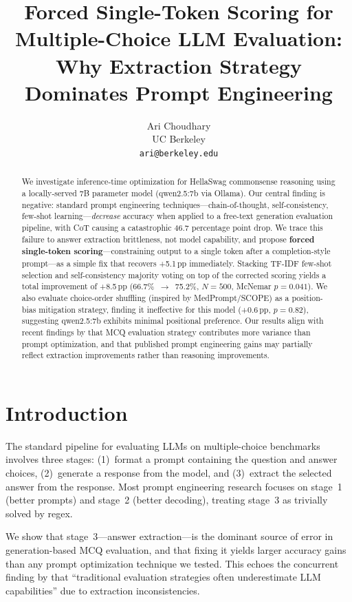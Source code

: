 \documentclass[11pt]{article}
\title{Forced Single-Token Scoring for Multiple-Choice LLM Evaluation:\\
Why Extraction Strategy Dominates Prompt Engineering}
\author{
  Ari Choudhary \\
  UC Berkeley \\
  \texttt{ari@berkeley.edu}
}
\date{}
\begin{document}
\maketitle

\begin{abstract}
We investigate inference-time optimization for HellaSwag commonsense reasoning using a locally-served 7B parameter model (qwen2.5:7b via Ollama). Our central finding is negative: standard prompt engineering techniques---chain-of-thought, self-consistency, few-shot learning---\emph{decrease} accuracy when applied to a free-text generation evaluation pipeline, with CoT causing a catastrophic 46.7 percentage point drop. We trace this failure to answer extraction brittleness, not model capability, and propose \textbf{forced single-token scoring}---constraining output to a single token after a completion-style prompt---as a simple fix that recovers +5.1\,pp immediately. Stacking TF-IDF few-shot selection and self-consistency majority voting on top of the corrected scoring yields a total improvement of +8.5\,pp (66.7\%~$\to$~75.2\%, $N{=}500$, McNemar $p{=}0.041$). We also evaluate choice-order shuffling (inspired by MedPrompt/SCOPE) as a position-bias mitigation strategy, finding it ineffective for this model (+0.6\,pp, $p{=}0.82$), suggesting qwen2.5:7b exhibits minimal positional preference. Our results align with recent findings by \citet{molfese2025} that MCQ evaluation strategy contributes more variance than prompt optimization, and that published prompt engineering gains may partially reflect extraction improvements rather than reasoning improvements.
\end{abstract}

\section{Introduction}

The standard pipeline for evaluating LLMs on multiple-choice benchmarks involves three stages: (1)~format a prompt containing the question and answer choices, (2)~generate a response from the model, and (3)~extract the selected answer from the response. Most prompt engineering research focuses on stage~1 (better prompts) and stage~2 (better decoding), treating stage~3 as trivially solved by regex.

We show that stage~3---answer extraction---is the dominant source of error in generation-based MCQ evaluation, and that fixing it yields larger accuracy gains than any prompt optimization technique we tested. This echoes the concurrent finding by \citet{molfese2025} that ``traditional evaluation strategies often underestimate LLM capabilities'' due to extraction inconsistencies.
\end{document}
